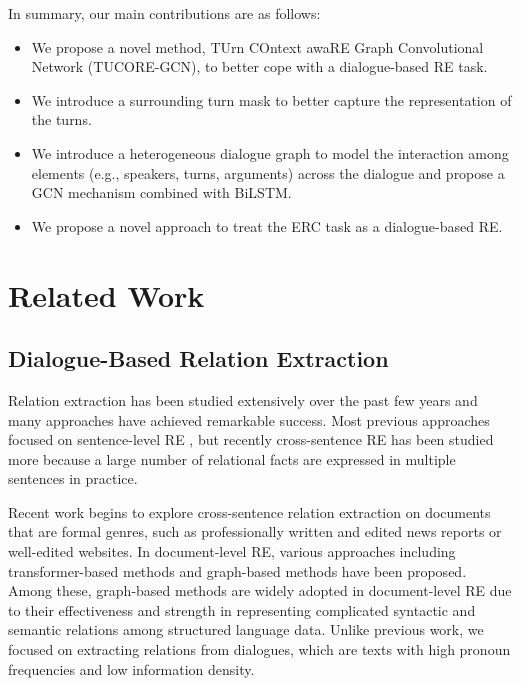 \documentclass[11pt]{article}
\begin{document}
In summary, our main contributions are as follows:
\begin{itemize}
\item We propose a novel method, TUrn COntext awaRE Graph Convolutional Network (TUCORE-GCN), to better cope with a dialogue-based RE task.
\item We introduce a surrounding turn mask to better capture the representation of the turns.
\item We introduce a heterogeneous dialogue graph to model the interaction among elements (e.g., speakers, turns, arguments) across the dialogue and propose a GCN mechanism combined with BiLSTM.
\item We propose a novel approach to treat the ERC task as a dialogue-based RE.
\end{itemize}

\section{Related Work}
\subsection{Dialogue-Based Relation Extraction} 
Relation extraction has been studied extensively over the past few years and many approaches have achieved remarkable success. Most previous approaches focused on sentence-level RE \citep{zeng-etal-2014-relation, wang-etal-2016-relation, zhang-etal-2017-position, zhu-etal-2019-graph}, but recently cross-sentence RE has been studied more because a large number of relational facts are expressed in multiple sentences in practice.

Recent work begins to explore cross-sentence relation extraction on documents that are formal genres, such as professionally written and edited news reports or well-edited websites. In document-level RE, various approaches including transformer-based methods \citep{DBLP:conf/pakdd/TangC0CFWY20, Ye2020CoreferentialRL, DBLP:journals/corr/abs-1909-11898} and graph-based methods \citep{christopoulou-etal-2019-connecting, nan-etal-2020-reasoning, zeng-etal-2020-double} have been proposed. Among these, graph-based methods are widely adopted in document-level RE due to their effectiveness and strength in representing complicated syntactic and semantic relations among structured language data. Unlike previous work, we focused on extracting relations from dialogues, which are texts with high pronoun frequencies and low information density.
\end{document}
